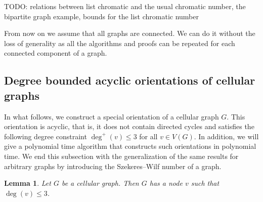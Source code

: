 \documentclass[a4paper, 12pt]{article}
\newtheorem{lem}{Lemma}[section]
\begin{document}
TODO: relations between list chromatic and the usual chromatic number, the bipartite graph example, bounds for the list chromatic number

From now on we assume that all graphs are connected. We can do it without the loss of generality as all the algorithms and proofs can be repeated for each connected component of a graph.

\subsection{Degree bounded acyclic orientations of cellular graphs}\label{sec:orientation}

In what follows, we construct a special orientation of a cellular graph $G$. This orientation is acyclic, that is, it does not contain directed cycles and satisfies the following degree constraint $\deg^+(v) \leqslant 3$ for all $v \in V(G)$. In addition, we will give a polynomial time algorithm that constructs such orientations in polynomial time. We end this subsection with the generalization of the same results for arbitrary graphs by introducing the Szekeres\---Wilf number of a graph.


\begin{lem}\label{lem:degree-constraint}
Let $G$ be a cellular graph. Then $G$ has a node $v$ such that $\deg(v) \leqslant 3$.
\end{lem}
\end{document}
